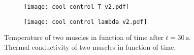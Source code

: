 \begin{figure}[t]
	\centering
	\begin{subfigure}[t]{0.45\textwidth}
		\centering\texttt{[image: cool\_control\_T\_v2.pdf]}
		\caption{\label{cool_control_T}}
	\end{subfigure}%
	\begin{subfigure}[t]{0.45\textwidth}
		\centering\texttt{[image: cool\_control\_lambda\_v2.pdf]}
		\caption{\label{cool_control_lambda}}
	\end{subfigure}
	\caption[Sustainable closed-loop \apc simulation]{ Temperature of two muscles in function of time after $t=\SI{30}{\second}$.  Thermal conductivity of two muscles in function of time. }
	\label{cool_simulation}
\end{figure}




